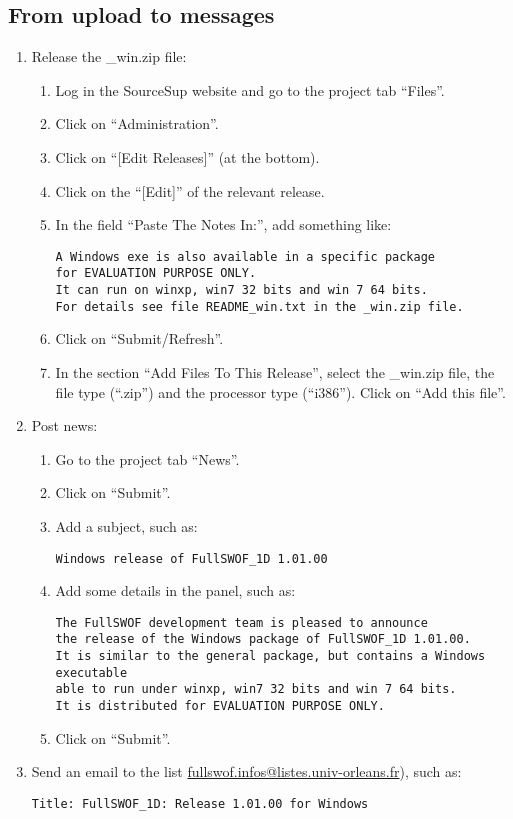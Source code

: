 \documentclass[a4paper, 11pt]{article}
\begin{document}
\subsection{From upload to messages}
\begin{enumerate}
\item Release the \_win.zip file:
\begin{enumerate}
\item Log in the SourceSup website and go to the project tab ``Files''.
\item Click on ``Administration''.
\item Click on ``[Edit Releases]'' (at the bottom).
\item Click on the ``[Edit]'' of the relevant release.
\item In the field ``Paste The Notes In:'', add something like:
\begin{verbatim}
A Windows exe is also available in a specific package 
for EVALUATION PURPOSE ONLY.
It can run on winxp, win7 32 bits and win 7 64 bits.
For details see file README_win.txt in the _win.zip file.
\end{verbatim}
\item Click on ``Submit/Refresh''.
\item In the section ``Add Files To This Release'', select the \_win.zip file,
the file type (``.zip'') and the processor type  (``i386''). Click on ``Add this file''.
\end{enumerate}
\item Post news:
\begin{enumerate}
\item Go to the project tab ``News''.
\item Click on ``Submit''.
\item Add a subject, such as:
\begin{verbatim}
Windows release of FullSWOF_1D 1.01.00
\end{verbatim}
\item Add some details in the panel, such as:
\begin{verbatim}
The FullSWOF development team is pleased to announce
the release of the Windows package of FullSWOF_1D 1.01.00.
It is similar to the general package, but contains a Windows executable 
able to run under winxp, win7 32 bits and win 7 64 bits.
It is distributed for EVALUATION PURPOSE ONLY.
\end{verbatim}
\item Click on ``Submit''.
\end{enumerate}
\item Send an email to the list
\href{mailto:fullswof.infos@listes.univ-orleans.fr}{fullswof.infos@listes.univ-orleans.fr}), such as:
\begin{verbatim}
Title: FullSWOF_1D: Release 1.01.00 for Windows


\end{verbatim}
\end{enumerate}
\end{document}
